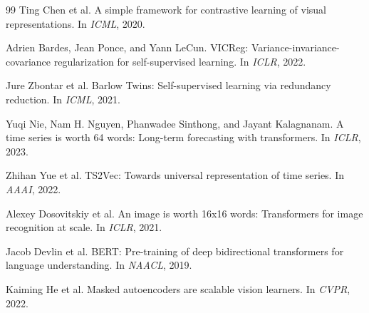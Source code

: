 \documentclass[twocolumn, 10pt]{article}
\begin{document}
\begin{thebibliography}{99}
Ting Chen et al.
\newblock A simple framework for contrastive learning of visual representations.
\newblock In \emph{ICML}, 2020.

Adrien Bardes, Jean Ponce, and Yann LeCun.
\newblock VICReg: Variance-invariance-covariance regularization for self-supervised learning.
\newblock In \emph{ICLR}, 2022.

Jure Zbontar et al.
\newblock Barlow Twins: Self-supervised learning via redundancy reduction.
\newblock In \emph{ICML}, 2021.

Yuqi Nie, Nam H. Nguyen, Phanwadee Sinthong, and Jayant Kalagnanam.
\newblock A time series is worth 64 words: Long-term forecasting with transformers.
\newblock In \emph{ICLR}, 2023.

Zhihan Yue et al.
\newblock TS2Vec: Towards universal representation of time series.
\newblock In \emph{AAAI}, 2022.

Alexey Dosovitskiy et al.
\newblock An image is worth 16x16 words: Transformers for image recognition at scale.
\newblock In \emph{ICLR}, 2021.

Jacob Devlin et al.
\newblock BERT: Pre-training of deep bidirectional transformers for language understanding.
\newblock In \emph{NAACL}, 2019.

Kaiming He et al.
\newblock Masked autoencoders are scalable vision learners.
\newblock In \emph{CVPR}, 2022.

\end{thebibliography}
\end{document}
